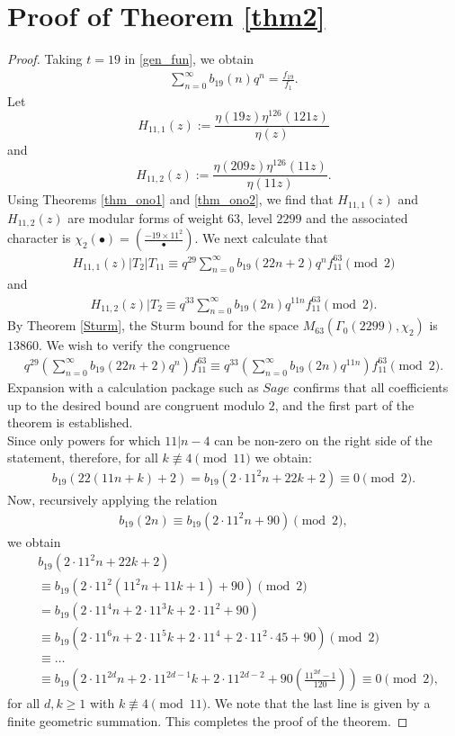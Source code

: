 \documentclass[reqno]{amsart}
\theoremstyle{definition}
\theoremstyle{remark}
\numberwithin{equation}{section}
\begin{document}
\section{Proof of Theorem \ref{thm2}}
\begin{proof}
Taking $t=19$ in \eqref{gen_fun}, we obtain
\begin{align}\label{thm2.1}
\sum_{n=0}^{\infty}b_{19}(n)q^n=\frac{f_{19}}{f_1}.
\end{align}
	Let $$H_{11,1}(z):= \frac{\eta(19z)\eta^{126}(121z)}{\eta(z)}$$
	and $$H_{11,2}(z):= \frac{\eta(209z)\eta^{126}(11z)}{\eta(11z)}.$$
	Using Theorems \ref{thm_ono1} and \ref{thm_ono2}, we find that $H_{11,1}(z)$ and $H_{11,2}(z)$ are modular forms of weight $63$, level $2299$ and the associated character is $\chi_2(\bullet)=(\frac{-19\times11^{2}}{\bullet})$. We next calculate that 
	\begin{align*}
H_{11,1}(z)|T_2|T_{11}\equiv q^{29}\sum_{n=0}^{\infty}b_{19}(22n+2)q^{n}f^{63}_{11}\pmod{2}
\end{align*}
and
\begin{align*}
H_{11,2}(z)|T_2\equiv q^{33}\sum_{n=0}^{\infty}b_{19}(2n)q^{11n}f^{63}_{11}\pmod{2}.
\end{align*}
	By Theorem \ref{Sturm}, the Sturm bound for the space $M_{63}\left(\Gamma_0(2299),\chi_2\right)$ is $13860$. We wish to verify the congruence
	\begin{align*}
	q^{29}\left(\sum_{n=0}^{\infty}b_{19}(22n+2)q^{n}\right)f^{63}_{11}\equiv q^{33}\left(\sum_{n=0}^{\infty}b_{19}(2n)q^{11n}\right)f^{63}_{11}\pmod 2.
	\end{align*} 
Expansion with a calculation package such as $Sage$ confirms that all coefficients up to the desired bound are congruent modulo $2$, and the first part of the theorem is established.\\
	Since only powers for which $11|n-4$ can be non-zero on the right side of the statement, therefore, for all $k\not\equiv 4\pmod{11}$ we obtain:
	\begin{align*}
	b_{19}(22(11n+k)+2)=b_{19}(2\cdot 11^2n+22k+2)\equiv 0\pmod2.
	\end{align*}
Now, recursively applying the relation 
	\begin{align*}
	b_{19}(2n)\equiv b_{19}(2\cdot 11^2 n+90)\pmod 2,
	\end{align*}
	we obtain
	\begin{align*}
	&b_{19}(2\cdot 11^2n+22k+2)\\
	&\equiv b_{19}(2\cdot 11^2(11^2n+11k+1)+90)\pmod 2\\
	&=b_{19}(2\cdot 11^4n+2\cdot11^3k +2\cdot 11^2+90)\\
	&\equiv b_{19}(2\cdot 11^6n+2\cdot11^5k+2\cdot 11^4+2\cdot 11^2\cdot 45 +90)\pmod 2\\
	&\equiv \ldots\\
	&\equiv b_{19}\left(2\cdot11^{2d}n+2\cdot 11^{2d-1}k+2\cdot11^{2d-2}+90\left(\frac{11^{2d}-1}{120}\right)\right)\equiv 0\pmod{2},
	\end{align*}
	for all $d,k\geq1$ with $k\not\equiv4\pmod{11}$. We note that the last line is given by a finite geometric summation. This completes the proof of the theorem.
\end{proof} 
\end{document}
